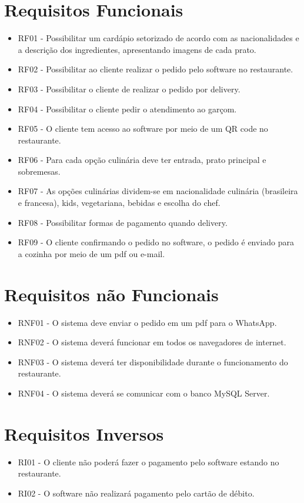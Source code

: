 \documentclass[12pt, a4paper]{article}
\begin{document}
  \section{Requisitos Funcionais}
  \begin{itemize}
  	\item RF01 - Possibilitar um cardápio setorizado de acordo com as nacionalidades e a descrição dos ingredientes, apresentando imagens de cada prato.
  	
  	\item RF02 - Possibilitar ao cliente realizar o pedido pelo software no restaurante.
  	
  	\item RF03 - Possibilitar o cliente de realizar o pedido por delivery.
  	
  	\item RF04 - Possibilitar o cliente pedir o atendimento ao garçom.
  	
  	\item RF05 - O cliente tem acesso ao software por meio de um QR code no restaurante.
  	
  	\item RF06 - Para cada opção culinária deve ter entrada, prato principal e sobremesas.
  	
  	\item RF07 -  As opções culinárias dividem-se em nacionalidade culinária (brasileira e francesa), kids, vegetariana, bebidas e escolha do chef.
  	
  	\item RF08 - Possibilitar formas de pagamento quando delivery.
  	
  	\item RF09 - O cliente confirmando o pedido no software, o pedido é enviado para a cozinha por meio de um pdf ou e-mail.
  \end{itemize}

\section{Requisitos não Funcionais}
  \begin{itemize}
		\item RNF01 - O sistema deve enviar o pedido em um pdf para o WhatsApp.
		
		\item RNF02 - O sistema deverá funcionar em todos os navegadores de internet.
		
		\item RNF03 - O sistema deverá ter disponibilidade durante o funcionamento do restaurante.
		
		\item RNF04 - O sistema deverá se comunicar com o banco MySQL Server.
  \end{itemize}


\section{Requisitos Inversos}
\begin{itemize}
	\item RI01 - O cliente não poderá fazer o pagamento pelo software estando no restaurante.
	\item RI02 - O software não realizará pagamento pelo cartão de débito.
	
	
\end{itemize}
\end{document}
